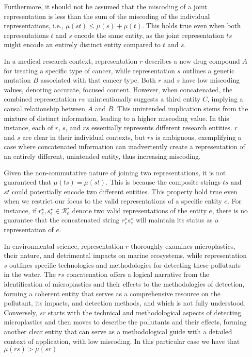 Furthermore, it should not be assumed that the miscoding of a joint representation is less than the sum of the miscoding of the individual representations, i.e., $\mu( st ) \leq \mu(s) + \mu(t)$. This holds true even when both representations $t$ and $s$ encode the same entity, as the joint representation $ts$ might encode an entirely distinct entity compared to $t$ and $s$.

\begin{example}
In a medical research context, representation $r$ describes a new drug compound $A$ for treating a specific type of cancer, while representation $s$ outlines a genetic mutation $B$ associated with that cancer type. Both $r$ and $s$ have low miscoding values, denoting accurate, focused content. However, when concatenated, the combined representation $rs$ unintentionally suggests a third entity $C$, implying a causal relationship between $A$ and $B$. This unintended implication stems from the mixture of distinct information, leading to a higher miscoding value. In this instance, each of $r$, $s$, and $rs$ essentially represents different research entities. $r$ and $s$ are clear in their individual contexts, but $rs$ is ambiguous, exemplifying a case where concatenated information can inadvertently create a representation of an entirely different, unintended entity, thus increasing miscoding.
\end{example}

Given the non-commutative nature of joining two representations, it is not guaranteed that $\mu(ts) = \mu(st)$. This is because the composite strings $ts$ and $st$ could potentially encode two different entities. This property hold true even when we restrict our focus to the valid representations of a specific entity $e$. For instance, if $r^\star_e, s^\star_e \in \mathcal{R}^\star_{e}$ denote two valid representations of the entity $e$, there is no guarantee that the concatenated string $r^\star_e s^\star_e$ will maintain its status as a representation of $e$.

\begin{example}
In environmental science, representation $r$ thoroughly examines microplastics, their nature, and detrimental impacts on marine ecosystems, while representation $s$ outlines specific technologies and methodologies for detecting these pollutants in the water. The $rs$ concatenation offers a logical narrative from the identification of microplastics and their effects to the methodologies of detection, forming a coherent entity that serves as a comprehensive resource on the pollutant, its impacts, and detection methods, and which is not fully understood. Conversely, $sr$ starts with the technical and methodological aspects of detecting microplastics and then moves to describe the pollutants and their effects, forming another clear entity that can serve as a methodological guide with a detailed context of application, with low miscoding. In this particular case we have that $\mu(rs) > \mu(sr)$
\end{example}

